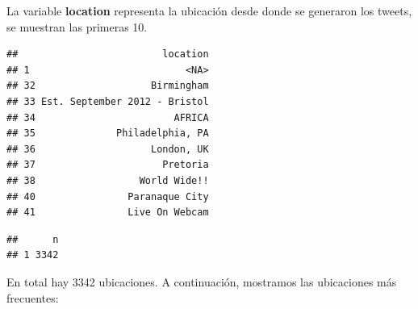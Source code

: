 \documentclass[
]{article}
\newenvironment{Shaded}{\begin{snugshade}}{\end{snugshade}}
\newcommand{\DecValTok}[1]{\textcolor[rgb]{0.00,0.00,0.81}{#1}}
\newcommand{\KeywordTok}[1]{\textcolor[rgb]{0.13,0.29,0.53}{\textbf{#1}}}
\newcommand{\NormalTok}[1]{#1}
\newcommand{\OperatorTok}[1]{\textcolor[rgb]{0.81,0.36,0.00}{\textbf{#1}}}
\newcommand{\StringTok}[1]{\textcolor[rgb]{0.31,0.60,0.02}{#1}}
\begin{document}
La variable \textbf{location} representa la ubicación desde donde se
generaron los tweets, se muestran las primeras 10.

\begin{Shaded}
\end{Shaded}

\begin{verbatim}
##                         location
## 1                           <NA>
## 32                    Birmingham
## 33 Est. September 2012 - Bristol
## 34                        AFRICA
## 35              Philadelphia, PA
## 36                    London, UK
## 37                      Pretoria
## 38                  World Wide!!
## 40                Paranaque City
## 41                Live On Webcam
\end{verbatim}

\begin{Shaded}
\end{Shaded}

\begin{verbatim}
##      n
## 1 3342
\end{verbatim}

En total hay 3342 ubicaciones. A continuación, mostramos las ubicaciones
más frecuentes:

\begin{Shaded}
\end{Shaded}
\end{document}

